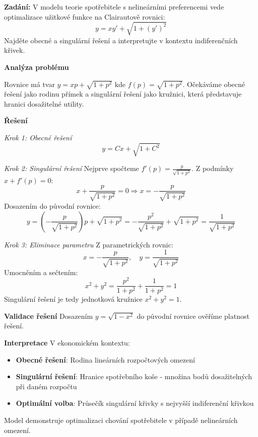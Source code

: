 \begin{example}
\label{ex:spotrebitel}

\noindent\textbf{Zadání:} V modelu teorie spotřebitele s nelineárními preferencemi vede optimalizace užitkové funkce na Clairautově rovnici:
\[
y = xy' + \sqrt{1 + (y')^2}
\]
Najděte obecné a singulární řešení a interpretujte v kontextu indiferenčních křivek.

\vspace{1.5\baselineskip}

\noindent\textbf{Analýza problému}

Rovnice má tvar $y = xp + \sqrt{1 + p^2}$ kde $f(p) = \sqrt{1 + p^2}$. Očekáváme obecné řešení jako rodinu přímek a singulární řešení jako kružnici, která představuje hranici dosažitelné utility.

\vspace{1.5\baselineskip}

\noindent\textbf{Řešení}

\noindent\textit{Krok 1: Obecné řešení}
\[
y = Cx + \sqrt{1 + C^2}
\]

\vspace{1\baselineskip}

\noindent\textit{Krok 2: Singulární řešení}
Nejprve spočteme $f'(p) = \frac{p}{\sqrt{1 + p^2}}$. Z podmínky $x + f'(p) = 0$:
\[
x + \frac{p}{\sqrt{1 + p^2}} = 0 \Rightarrow x = -\frac{p}{\sqrt{1 + p^2}}
\]
Dosazením do původní rovnice:
\[
y = \left(-\frac{p}{\sqrt{1 + p^2}}\right)p + \sqrt{1 + p^2} = -\frac{p^2}{\sqrt{1 + p^2}} + \sqrt{1 + p^2} = \frac{1}{\sqrt{1 + p^2}}
\]

\vspace{1\baselineskip}

\noindent\textit{Krok 3: Eliminace parametru}
Z parametrických rovnic:
\[
x = -\frac{p}{\sqrt{1 + p^2}}, \quad y = \frac{1}{\sqrt{1 + p^2}}
\]
Umocněním a sečtením:
\[
x^2 + y^2 = \frac{p^2}{1 + p^2} + \frac{1}{1 + p^2} = 1
\]
Singulární řešení je tedy jednotková kružnice $x^2 + y^2 = 1$.

\vspace{1.5\baselineskip}

\noindent\textbf{Validace řešení}
Dosazením $y = \sqrt{1 - x^2}$ do původní rovnice ověříme platnost řešení.

\vspace{1.5\baselineskip}

\noindent\textbf{Interpretace}
V ekonomickém kontextu:
\begin{itemize}
\item \textbf{Obecné řešení}: Rodina lineárních rozpočtových omezení
\item \textbf{Singulární řešení}: Hranice spotřebního koše - množina bodů dosažitelných při daném rozpočtu
\item \textbf{Optimální volba}: Průsečík singulární křivky s nejvyšší indiferenční křivkou
\end{itemize}
Model demonstruje optimalizaci chování spotřebitele v případě nelineárních omezení.

\end{example}

